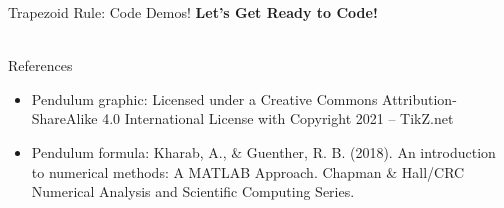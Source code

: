 \documentclass[t]{beamer}
\begin{document}
\begin{frame}{Trapezoid Rule: Code Demos!}
\center
\Large\textbf{Let's Get Ready to Code!} \\ \, \\

\end{frame}

\begin{frame}{References}
\begin{itemize}
    \item Pendulum graphic: Licensed under a Creative Commons Attribution-ShareAlike 4.0 International License with Copyright 2021 – TikZ.net
    \item Pendulum formula: Kharab, A., \& Guenther, R. B. (2018). An introduction to numerical methods: A MATLAB Approach. Chapman \& Hall/CRC Numerical Analysis and Scientific Computing Series.
\end{itemize}
\end{frame}
\end{document}
